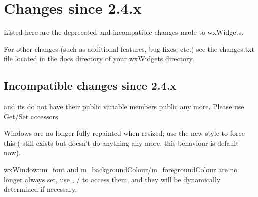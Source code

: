 \section{Changes since 2.4.x}\label{changes}

Listed here are the deprecated and incompatible changes made to wxWidgets.

For other changes (such as additional features, bug fixes, etc.) see the changes.txt file located in the docs directory of your wxWidgets directory.

\subsection{Incompatible changes since 2.4.x}\label{incompatiblesince24}


 and its  do not have their public variable members public any more.
Please use Get/Set accessors.


Windows are no longer fully repainted when resized; use the new style  to force this ( still exists but doesn't do anything any more, this behaviour is default now).


wxWindow::m\_font and m\_backgroundColour/m\_foregroundColour are no longer always set, use , / to access them, and they will be dynamically determined if necessary.

